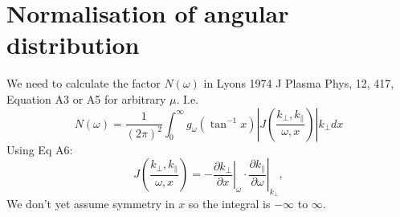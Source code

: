\documentclass[]{article}
\begin{document}
\section{Normalisation of angular distribution}
\newcommand{\atan}{\mathrm{atan}}
\newcommand{\st}{\right|}

We need to calculate the factor $N(\omega)$ in Lyons 1974  J Plasma Phys, 12, 417, Equation A3 or A5 for arbitrary $\mu$. I.e. 
\begin{equation}
N(\omega) = \frac{1}{(2\pi)^2} \int_0^\infty g_\omega( \tan^{-1} x ) \left| J \left( \frac{k_\perp, k_\parallel}{\omega, x} \right)\right| k_\perp d x
\end{equation}
Using Eq A6:
\begin{equation}
J \left( \frac{k_\perp, k_\parallel}{\omega, x} \right) = - \left.\frac{\partial k_\perp}{\partial x}\right|_\omega \cdot \left.\frac{\partial k_\parallel}{\partial \omega}\right|_{k_\perp}, 
\end{equation}
We don't yet assume symmetry in $x$ so the integral is $-\infty$ to $\infty$.
\end{document}
